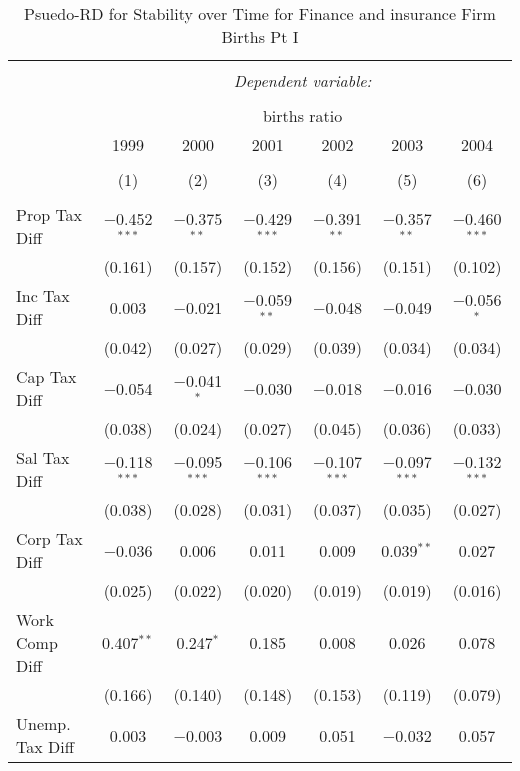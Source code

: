 
\begin{table}[!htbp] \centering 
  \caption{Psuedo-RD for Stability over Time for  Finance and insurance Firm Births Pt I} 
  \label{52year} 
\small 
\begin{tabular}{@{\extracolsep{5pt}}lcccccc} 
\\[-1.8ex]\hline 
\hline \\[-1.8ex] 
 & \multicolumn{6}{c}{\textit{Dependent variable:}} \\ 
\cline{2-7} 
\\[-1.8ex] & \multicolumn{6}{c}{births ratio} \\ 
 & 1999 & 2000 & 2001 & 2002 & 2003 & 2004 \\ 
\\[-1.8ex] & (1) & (2) & (3) & (4) & (5) & (6)\\ 
\hline \\[-1.8ex] 
 Prop Tax Diff & $-$0.452$^{***}$ & $-$0.375$^{**}$ & $-$0.429$^{***}$ & $-$0.391$^{**}$ & $-$0.357$^{**}$ & $-$0.460$^{***}$ \\ 
  & (0.161) & (0.157) & (0.152) & (0.156) & (0.151) & (0.102) \\ 
  Inc Tax Diff & 0.003 & $-$0.021 & $-$0.059$^{**}$ & $-$0.048 & $-$0.049 & $-$0.056$^{*}$ \\ 
  & (0.042) & (0.027) & (0.029) & (0.039) & (0.034) & (0.034) \\ 
  Cap Tax Diff & $-$0.054 & $-$0.041$^{*}$ & $-$0.030 & $-$0.018 & $-$0.016 & $-$0.030 \\ 
  & (0.038) & (0.024) & (0.027) & (0.045) & (0.036) & (0.033) \\ 
  Sal Tax Diff & $-$0.118$^{***}$ & $-$0.095$^{***}$ & $-$0.106$^{***}$ & $-$0.107$^{***}$ & $-$0.097$^{***}$ & $-$0.132$^{***}$ \\ 
  & (0.038) & (0.028) & (0.031) & (0.037) & (0.035) & (0.027) \\ 
  Corp Tax Diff & $-$0.036 & 0.006 & 0.011 & 0.009 & 0.039$^{**}$ & 0.027 \\ 
  & (0.025) & (0.022) & (0.020) & (0.019) & (0.019) & (0.016) \\ 
  Work Comp Diff & 0.407$^{**}$ & 0.247$^{*}$ & 0.185 & 0.008 & 0.026 & 0.078 \\ 
  & (0.166) & (0.140) & (0.148) & (0.153) & (0.119) & (0.079) \\ 
  Unemp. Tax Diff & 0.003 & $-$0.003 & 0.009 & 0.051 & $-$0.032 & 0.057 \\ 

\end{tabular}
\end{table}
